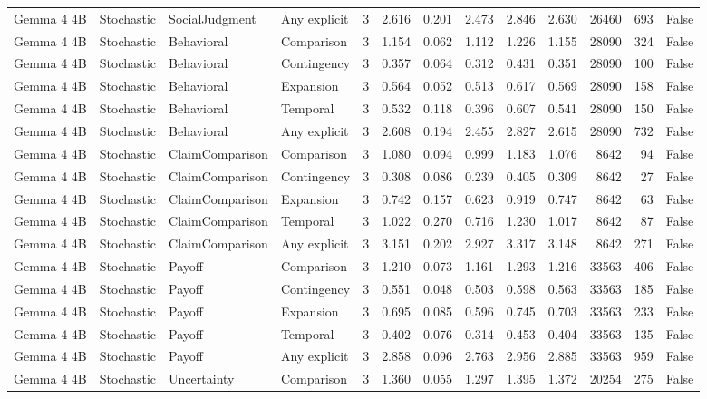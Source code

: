\begin{tabular}{llllrrrrrrrrr}
Gemma 4 4B & Stochastic & SocialJudgment & Any explicit & 3 & 2.616 & 0.201 & 2.473 & 2.846 & 2.630 & 26460 & 693 & False \\
Gemma 4 4B & Stochastic & Behavioral & Comparison & 3 & 1.154 & 0.062 & 1.112 & 1.226 & 1.155 & 28090 & 324 & False \\
Gemma 4 4B & Stochastic & Behavioral & Contingency & 3 & 0.357 & 0.064 & 0.312 & 0.431 & 0.351 & 28090 & 100 & False \\
Gemma 4 4B & Stochastic & Behavioral & Expansion & 3 & 0.564 & 0.052 & 0.513 & 0.617 & 0.569 & 28090 & 158 & False \\
Gemma 4 4B & Stochastic & Behavioral & Temporal & 3 & 0.532 & 0.118 & 0.396 & 0.607 & 0.541 & 28090 & 150 & False \\
Gemma 4 4B & Stochastic & Behavioral & Any explicit & 3 & 2.608 & 0.194 & 2.455 & 2.827 & 2.615 & 28090 & 732 & False \\
Gemma 4 4B & Stochastic & ClaimComparison & Comparison & 3 & 1.080 & 0.094 & 0.999 & 1.183 & 1.076 & 8642 & 94 & False \\
Gemma 4 4B & Stochastic & ClaimComparison & Contingency & 3 & 0.308 & 0.086 & 0.239 & 0.405 & 0.309 & 8642 & 27 & False \\
Gemma 4 4B & Stochastic & ClaimComparison & Expansion & 3 & 0.742 & 0.157 & 0.623 & 0.919 & 0.747 & 8642 & 63 & False \\
Gemma 4 4B & Stochastic & ClaimComparison & Temporal & 3 & 1.022 & 0.270 & 0.716 & 1.230 & 1.017 & 8642 & 87 & False \\
Gemma 4 4B & Stochastic & ClaimComparison & Any explicit & 3 & 3.151 & 0.202 & 2.927 & 3.317 & 3.148 & 8642 & 271 & False \\
Gemma 4 4B & Stochastic & Payoff & Comparison & 3 & 1.210 & 0.073 & 1.161 & 1.293 & 1.216 & 33563 & 406 & False \\
Gemma 4 4B & Stochastic & Payoff & Contingency & 3 & 0.551 & 0.048 & 0.503 & 0.598 & 0.563 & 33563 & 185 & False \\
Gemma 4 4B & Stochastic & Payoff & Expansion & 3 & 0.695 & 0.085 & 0.596 & 0.745 & 0.703 & 33563 & 233 & False \\
Gemma 4 4B & Stochastic & Payoff & Temporal & 3 & 0.402 & 0.076 & 0.314 & 0.453 & 0.404 & 33563 & 135 & False \\
Gemma 4 4B & Stochastic & Payoff & Any explicit & 3 & 2.858 & 0.096 & 2.763 & 2.956 & 2.885 & 33563 & 959 & False \\
Gemma 4 4B & Stochastic & Uncertainty & Comparison & 3 & 1.360 & 0.055 & 1.297 & 1.395 & 1.372 & 20254 & 275 & False \\

\end{tabular}

